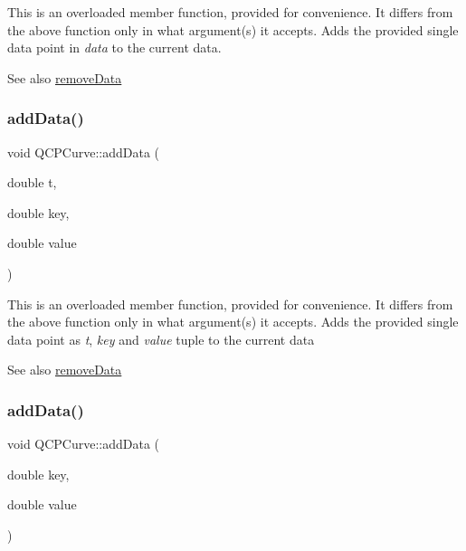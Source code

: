 This is an overloaded member function, provided for convenience. It differs from the above function only in what argument(s) it accepts. Adds the provided single data point in {\itshape data} to the current data. \begin{DoxySeeAlso}{See also}
\mbox{\hyperlink{class_q_c_p_curve_ad45bb5479be799163028ef2b776f7221}{remove\+Data}} 
\end{DoxySeeAlso}
\mbox{\label{class_q_c_p_curve_a13398b236f6926014e404eeb5b9f415c}} 
\subsubsection{\texorpdfstring{add\+Data()}{addData()}\hspace{0.1cm}{\footnotesize\ttfamily [3/5]}}
{\footnotesize\ttfamily void Q\+C\+P\+Curve\+::add\+Data (\begin{DoxyParamCaption}\item[{double}]{t,  }\item[{double}]{key,  }\item[{double}]{value }\end{DoxyParamCaption})}

This is an overloaded member function, provided for convenience. It differs from the above function only in what argument(s) it accepts. Adds the provided single data point as {\itshape t}, {\itshape key} and {\itshape value} tuple to the current data \begin{DoxySeeAlso}{See also}
\mbox{\hyperlink{class_q_c_p_curve_ad45bb5479be799163028ef2b776f7221}{remove\+Data}} 
\end{DoxySeeAlso}
\mbox{\label{class_q_c_p_curve_ada4762e793cd5707b33f35b8a4b0f8fb}} 
\subsubsection{\texorpdfstring{add\+Data()}{addData()}\hspace{0.1cm}{\footnotesize\ttfamily [4/5]}}
{\footnotesize\ttfamily void Q\+C\+P\+Curve\+::add\+Data (\begin{DoxyParamCaption}\item[{double}]{key,  }\item[{double}]{value }\end{DoxyParamCaption})}

